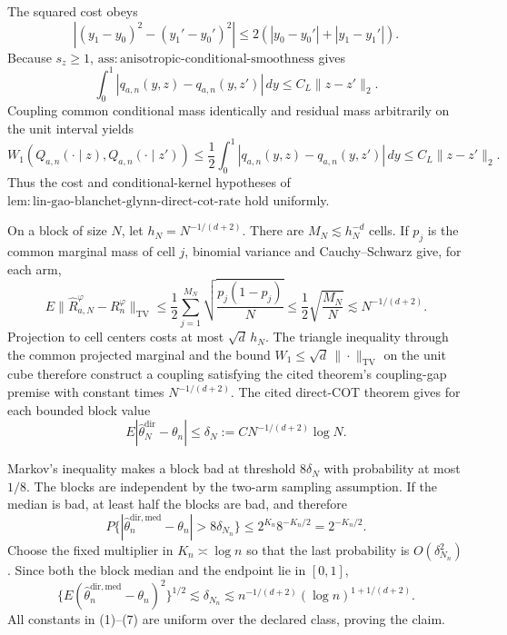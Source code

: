 The squared cost obeys
\[
|(y_1-y_0)^2-(y_1'-y_0')^2|
\le2(|y_0-y_0'|+|y_1-y_1'|).                                      \tag{1}
\]
Because \(s_z\ge1\), \(\mathrm{ass{:}anisotropic\text{-}conditional\text{-}smoothness}\) gives
\[
\int_0^1|q_{a,n}(y,z)-q_{a,n}(y,z')|\,dy
\le C_L\|z-z'\|_2.                                                \tag{2}
\]
Coupling common conditional mass identically and residual mass arbitrarily on the unit interval yields
\[
W_1(Q_{a,n}(\cdot\mid z),Q_{a,n}(\cdot\mid z'))
\le\frac12\int_0^1|q_{a,n}(y,z)-q_{a,n}(y,z')|\,dy
\le C_L\|z-z'\|_2.                                                \tag{3}
\]
Thus the cost and conditional-kernel hypotheses of \(\mathrm{lem{:}lin\text{-}gao\text{-}blanchet\text{-}glynn\text{-}direct\text{-}cot\text{-}rate}\) hold uniformly.

On a block of size \(N\), let \(h_N=N^{-1/(d+2)}\). There are \(M_N\lesssim h_N^{-d}\) cells. If \(p_j\) is the common marginal mass of cell \(j\), binomial variance and Cauchy--Schwarz give, for each arm,
\[
E\|\widehat R_{a,N}^{\varphi}-R_n^\varphi\|_{\mathrm{TV}}
\le\frac12\sum_{j=1}^{M_N}\sqrt{\frac{p_j(1-p_j)}N}
\le\frac12\sqrt{\frac{M_N}{N}}
\lesssim N^{-1/(d+2)}.                                             \tag{4}
\]
Projection to cell centers costs at most \(\sqrt d\,h_N\). The triangle inequality through the common projected marginal and the bound \(W_1\le\sqrt d\,\|\cdot\|_{\mathrm{TV}}\) on the unit cube therefore construct a coupling satisfying the cited theorem's coupling-gap premise with constant times \(N^{-1/(d+2)}\). The cited direct-COT theorem gives for each bounded block value
\[
E|\widehat\theta_N^{\mathrm{dir}}-\theta_n|
\le\delta_N:=C N^{-1/(d+2)}\log N.                                \tag{5}
\]

Markov's inequality makes a block bad at threshold \(8\delta_N\) with probability at most \(1/8\). The blocks are independent by the two-arm sampling assumption. If the median is bad, at least half the blocks are bad, and therefore
\[
P\{|\widehat\theta_n^{\mathrm{dir,med}}-\theta_n|>8\delta_{N_n}\}
\le2^{K_n}8^{-K_n/2}=2^{-K_n/2}.                                  \tag{6}
\]
Choose the fixed multiplier in \(K_n\asymp\log n\) so that the last probability is \(O(\delta_{N_n}^2)\). Since both the block median and the endpoint lie in \([0,1]\),
\[
\{E(\widehat\theta_n^{\mathrm{dir,med}}-\theta_n)^2\}^{1/2}
\lesssim\delta_{N_n}
\lesssim n^{-1/(d+2)}(\log n)^{1+1/(d+2)}.                         \tag{7}
\]
All constants in (1)--(7) are uniform over the declared class, proving the claim.